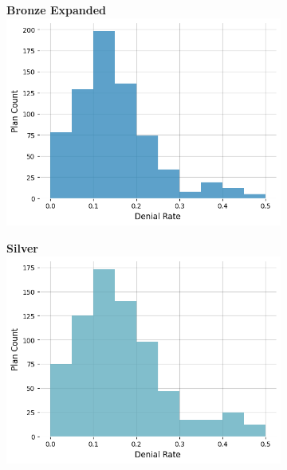 \documentclass[12pt, a4paper,twoside,parskip=full]{report}
\theoremstyle{plain} %
\theoremstyle{definition} %
\theoremstyle{remark} %
\numberwithin{equation}{chapter}
\begin{document}
\begin{figure}
\begin{subfigure}[t]{0.49\textwidth}
				\end{subfigure}
				\hfill
				\vspace{1em}
				\begin{subfigure}[t]{0.49\textwidth}
					\centering
					\textbf{Bronze Expanded}
					\includegraphics[width=\textwidth]{images/cms_puf/Bronze Expanded_dist.png}
				\end{subfigure}
				\hfill
				\begin{subfigure}[t]{0.49\textwidth}
					\centering
					\textbf{Silver}
					\includegraphics[width=\textwidth]{images/cms_puf/Silver_dist.png}
				\end{subfigure}
				\hfill
				\vspace{1em}

\end{figure}
\end{document}
